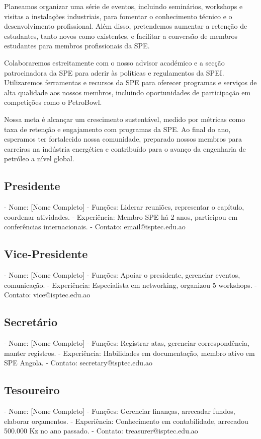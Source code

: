 \documentclass[12pt]{article}
\begin{document}
Planeamos organizar uma série de eventos, incluindo seminários, workshops e visitas a instalações industriais, para fomentar o conhecimento técnico e o desenvolvimento profissional. Além disso, pretendemos aumentar a retenção de estudantes, tanto novos como existentes, e facilitar a conversão de membros estudantes para membros profissionais da SPE.

Colaboraremos estreitamente com o nosso advisor académico e a secção patrocinadora da SPE para aderir às políticas e regulamentos da SPEI. Utilizaremos ferramentas e recursos da SPE para oferecer programas e serviços de alta qualidade aos nossos membros, incluindo oportunidades de participação em competições como o PetroBowl.

Nossa meta é alcançar um crescimento sustentável, medido por métricas como taxa de retenção e engajamento com programas da SPE. Ao final do ano, esperamos ter fortalecido nossa comunidade, preparado nossos membros para carreiras na indústria energética e contribuído para o avanço da engenharia de petróleo a nível global.

\subsection{Presidente}
- Nome: [Nome Completo]
- Funções: Liderar reuniões, representar o capítulo, coordenar atividades.
- Experiência: Membro SPE há 2 anos, participou em conferências internacionais.
- Contato: email@isptec.edu.ao

\subsection{Vice-Presidente}
- Nome: [Nome Completo]
- Funções: Apoiar o presidente, gerenciar eventos, comunicação.
- Experiência: Especialista em networking, organizou 5 workshops.
- Contato: vice@isptec.edu.ao

\subsection{Secretário}
- Nome: [Nome Completo]
- Funções: Registrar atas, gerenciar correspondência, manter registros.
- Experiência: Habilidades em documentação, membro ativo em SPE Angola.
- Contato: secretary@isptec.edu.ao

\subsection{Tesoureiro}
- Nome: [Nome Completo]
- Funções: Gerenciar finanças, arrecadar fundos, elaborar orçamentos.
- Experiência: Conhecimento em contabilidade, arrecadou 500.000 Kz no ano passado.
- Contato: treasurer@isptec.edu.ao
\end{document}
